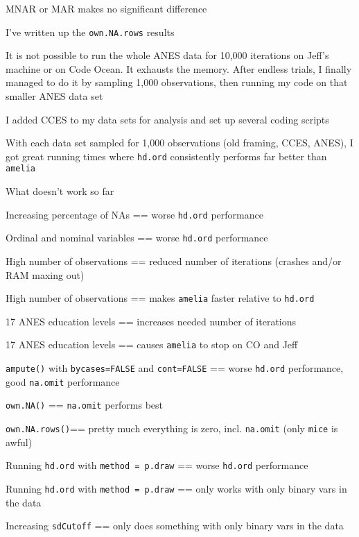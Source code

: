 \begin{coi}
\begin{coi}
				\item MNAR or MAR makes no significant difference
			\end{coi}
		\item I've written up the \texttt{own.NA.rows} results
		\item It is not possible to run the whole ANES data for 10,000 iterations on Jeff's machine or on Code Ocean. It exhausts the memory. After endless trials, I finally managed to do it by sampling 1,000 observations, then running my code on that smaller ANES data set
		\item I added CCES to my data sets for analysis and set up several coding scripts
		\item With each data set sampled for 1,000 observations (old framing, CCES, ANES), I got great running times where \texttt{hd.ord} consistently performs far better than \texttt{amelia}
		\item What doesn't work so far
			\begin{coi}
				\item Increasing percentage of NAs == worse \texttt{hd.ord} performance
				\item Ordinal and nominal variables == worse \texttt{hd.ord} performance
				\item High number of observations == reduced number of iterations (crashes and/or RAM maxing out)
				\item High number of observations == makes \texttt{amelia} faster relative to \texttt{hd.ord}
				\item 17 ANES education levels == increases needed number of iterations
				\item 17 ANES education levels == causes \texttt{amelia} to stop on CO and Jeff
				\item \texttt{ampute()} with \texttt{bycases=FALSE} and \texttt{cont=FALSE} == worse \texttt{hd.ord} performance, good \texttt{na.omit} performance
				\item \texttt{own.NA()} == \texttt{na.omit} performs best
				\item \texttt{own.NA.rows()}== pretty much everything is zero, incl. \texttt{na.omit} (only \texttt{mice} is awful)
				\item Running \texttt{hd.ord} with \texttt{method = p.draw} == worse \texttt{hd.ord} performance
				\item Running \texttt{hd.ord} with \texttt{method = p.draw} == only works with only binary vars in the data
				\item Increasing \texttt{sdCutoff} == only does something with only binary vars in the data

\end{coi}
\end{coi}
